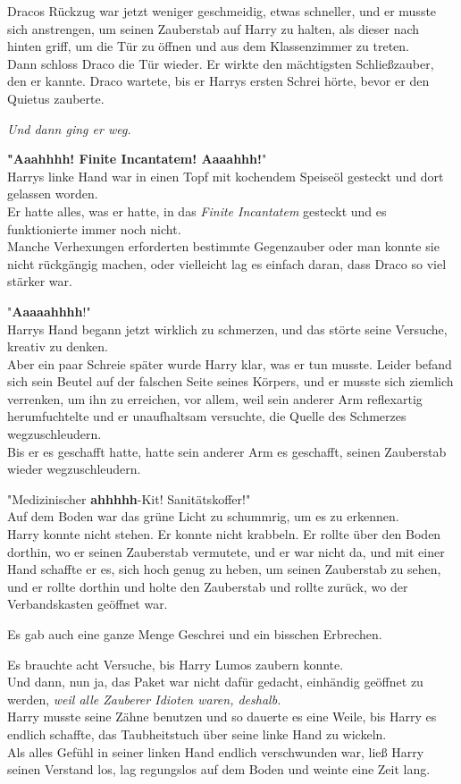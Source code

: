 {Dracos Rückzug war jetzt weniger geschmeidig, etwas schneller, und er musste sich anstrengen, um seinen Zauberstab auf Harry zu halten, als dieser nach hinten griff, um die Tür zu öffnen und aus dem Klassenzimmer zu treten.\\ Dann schloss Draco die Tür wieder. Er wirkte den mächtigsten Schließzauber, den er kannte. Draco wartete, bis er Harrys ersten Schrei hörte, bevor er den Quietus zauberte.

\emph{Und dann ging er weg.}

\textbf{"Aaahhhh! Finite Incantatem! Aaaahhh!}"\\ Harrys linke Hand war in einen Topf mit kochendem Speiseöl gesteckt und dort gelassen worden.\\ Er hatte alles, was er hatte, in das \emph{Finite Incantatem} gesteckt und es funktionierte immer noch nicht.\\ Manche Verhexungen erforderten bestimmte Gegenzauber oder man konnte sie nicht rückgängig machen, oder vielleicht lag es einfach daran, dass Draco so viel stärker war.

"\textbf{Aaaaahhhh}!"\\ Harrys Hand begann jetzt wirklich zu schmerzen, und das störte seine Versuche, kreativ zu denken.\\ Aber ein paar Schreie später wurde Harry klar, was er tun musste. Leider befand sich sein Beutel auf der falschen Seite seines Körpers, und er musste sich ziemlich verrenken, um ihn zu erreichen, vor allem, weil sein anderer Arm reflexartig herumfuchtelte und er unaufhaltsam versuchte, die Quelle des Schmerzes wegzuschleudern.\\ Bis er es geschafft hatte, hatte sein anderer Arm es geschafft, seinen Zauberstab wieder wegzuschleudern.

"Medizinischer \textbf{ahhhhh}-Kit! Sanitätskoffer!"\\ Auf dem Boden war das grüne Licht zu schummrig, um es zu erkennen.\\ Harry konnte nicht stehen. Er konnte nicht krabbeln. Er rollte über den Boden dorthin, wo er seinen Zauberstab vermutete, und er war nicht da, und mit einer Hand schaffte er es, sich hoch genug zu heben, um seinen Zauberstab zu sehen, und er rollte dorthin und holte den Zauberstab und rollte zurück, wo der Verbandskasten geöffnet war.

Es gab auch eine ganze Menge Geschrei und ein bisschen Erbrechen.

Es brauchte acht Versuche, bis Harry Lumos zaubern konnte.\\ Und dann, nun ja, das Paket war nicht dafür gedacht, einhändig geöffnet zu werden, \emph{weil alle Zauberer Idioten waren, deshalb.}\\ Harry musste seine Zähne benutzen und so dauerte es eine Weile, bis Harry es endlich schaffte, das Taubheitstuch über seine linke Hand zu wickeln.\\ Als alles Gefühl in seiner linken Hand endlich verschwunden war, ließ Harry seinen Verstand los, lag regungslos auf dem Boden und weinte eine Zeit lang.

}
